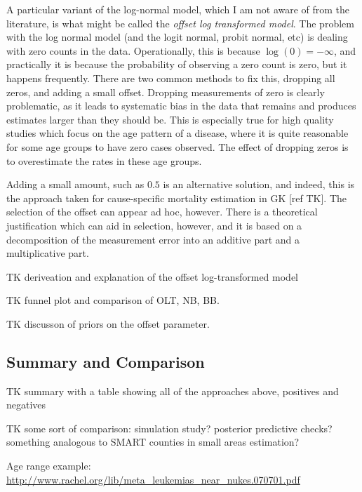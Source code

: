 A particular variant of the log-normal model, which I am not aware of
from the literature, is what might be called the \emph{offset log
transformed model}.  The problem with the log normal model (and the
logit normal, probit normal, etc) is dealing with zero counts in the
data.  Operationally, this is because $\log(0) = -\infty$, and
practically it is because the probability of observing a zero
count is zero, but it happens frequently.  There are two common
methods to fix this, dropping all zeros, and adding a small offset.
Dropping measurements of zero is clearly problematic, as it leads to
systematic bias in the data that remains and produces estimates larger
than they should be.  This is especially true for high quality studies
which focus on the age pattern of a disease, where it is quite
reasonable for some age groups to have zero cases observed.  The
effect of dropping zeros is to overestimate the rates in these age
groups.

Adding a small amount, such as $0.5$ is an alternative solution, and
indeed, this is the approach taken for cause-specific mortality estimation
in GK [ref TK].  The selection of the offset can appear ad hoc,
however.  There is a theoretical justification which can aid in
selection, however, and it is based on a decomposition of the
measurement error into an additive part and a multiplicative part.

TK deriveation and explanation of the offset log-transformed model

TK funnel plot and comparison of OLT, NB, BB.

TK discusson of priors on the offset parameter.

\subsection{Summary and Comparison}
TK summary with a table showing all of the approaches above, positives
and negatives

TK some sort of comparison: simulation study? posterior predictive
checks? something analogous to SMART counties in small areas
estimation?

Age range example:
\url{
http://www.rachel.org/lib/meta_leukemias_near_nukes.070701.pdf
}
